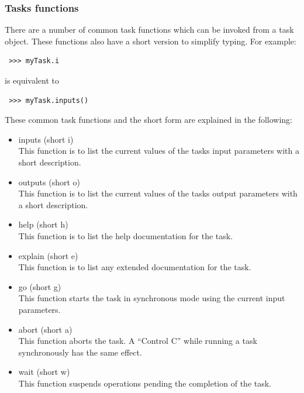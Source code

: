 \documentclass[11pt]{report}
\begin{document}
\subsubsection{Tasks functions}
There are a number of common task functions which can be invoked from
a task object.
These functions also have a short version to simplify typing.
For example:
\begin{verbatim}
 >>> myTask.i
\end{verbatim}
is equivalent to
\begin{verbatim}
 >>> myTask.inputs()
\end{verbatim}
These common task functions and the short form are explained in the
following:
\begin{itemize}
\item inputs (short i)\\
This function is to list the current values of the tasks input
parameters with a short description.
\item outputs (short o)\\
This function is to list the current values of the tasks output
parameters with a short description.
\item help (short h)\\
This function is to list the help documentation for the task.
\item explain (short e)\\
This function is to list any extended documentation for the task.
\item go (short g)\\
This function starts the task in synchronous mode using the current
input parameters.
\item abort (short a)\\
This function aborts the task.  
A ``Control C'' while running a task synchronously has the same effect.
\item wait (short w)\\
This function suspends operations pending the completion of the
task. 
\end{itemize}
\end{document}
